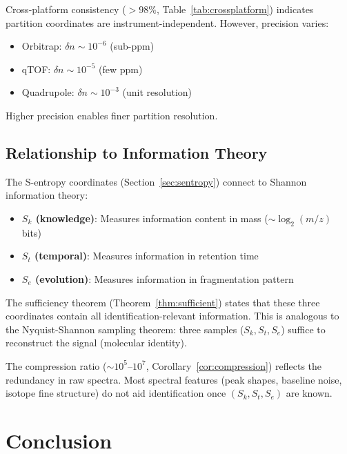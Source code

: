 \documentclass[twocolumn,10pt]{article}
\begin{document}
Cross-platform consistency ($> 98\%$, Table~\ref{tab:crossplatform}) indicates partition coordinates are instrument-independent. However, precision varies:
\begin{itemize}
    \item Orbitrap: $\delta n \sim 10^{-6}$ (sub-ppm)
    \item qTOF: $\delta n \sim 10^{-5}$ (few ppm)
    \item Quadrupole: $\delta n \sim 10^{-3}$ (unit resolution)
\end{itemize}

Higher precision enables finer partition resolution.

\subsection{Relationship to Information Theory}

The S-entropy coordinates (Section~\ref{sec:sentropy}) connect to Shannon information theory:

\begin{itemize}
    \item \textbf{$S_k$ (knowledge)}: Measures information content in mass ($\sim \log_2(m/z)$ bits)
    \item \textbf{$S_t$ (temporal)}: Measures information in retention time
    \item \textbf{$S_e$ (evolution)}: Measures information in fragmentation pattern
\end{itemize}

The sufficiency theorem (Theorem~\ref{thm:sufficient}) states that these three coordinates contain all identification-relevant information. This is analogous to the Nyquist-Shannon sampling theorem: three samples ($S_k, S_t, S_e$) suffice to reconstruct the signal (molecular identity).

The compression ratio ($\sim 10^5$–$10^7$, Corollary~\ref{cor:compression}) reflects the redundancy in raw spectra. Most spectral features (peak shapes, baseline noise, isotope fine structure) do not aid identification once $(S_k, S_t, S_e)$ are known.

\section{Conclusion}
\end{document}
